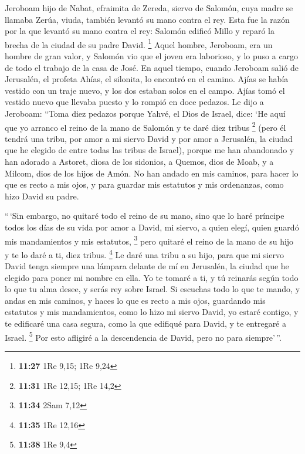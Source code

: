  Jeroboam hijo de Nabat, efraimita de Zereda, siervo de
Salomón, cuya madre se llamaba Zerúa, viuda, también levantó su mano
contra el rey.  Esta fue la razón por la que levantó su
mano contra el rey: Salomón edificó Millo y reparó la brecha de la
ciudad de su padre David. \footnote{\textbf{11:27} 1Re 9,15; 1Re 9,24}
 Aquel hombre, Jeroboam, era un hombre de gran valor, y
Salomón vio que el joven era laborioso, y lo puso a cargo de todo el
trabajo de la casa de José.  En aquel tiempo, cuando
Jeroboam salió de Jerusalén, el profeta Ahías, el silonita, lo encontró
en el camino. Ajías se había vestido con un traje nuevo, y los dos
estaban solos en el campo.  Ajías tomó el vestido nuevo
que llevaba puesto y lo rompió en doce pedazos.  Le dijo
a Jeroboam: ``Toma diez pedazos porque Yahvé, el Dios de Israel, dice:
`He aquí que yo arranco el reino de la mano de Salomón y te daré diez
tribus \footnote{\textbf{11:31} 1Re 12,15; 1Re 14,2} 
(pero él tendrá una tribu, por amor a mi siervo David y por amor a
Jerusalén, la ciudad que he elegido de entre todas las tribus de
Israel),  porque me han abandonado y han adorado a
Astoret, diosa de los sidonios, a Quemos, dios de Moab, y a Milcom, dios
de los hijos de Amón. No han andado en mis caminos, para hacer lo que es
recto a mis ojos, y para guardar mis estatutos y mis ordenanzas, como
hizo David su padre.

 ``\,`Sin embargo, no quitaré todo el reino de su mano,
sino que lo haré príncipe todos los días de su vida por amor a David, mi
siervo, a quien elegí, quien guardó mis mandamientos y mis estatutos,
\footnote{\textbf{11:34} 2Sam 7,12}  pero quitaré el
reino de la mano de su hijo y te lo daré a ti, diez tribus. \footnote{\textbf{11:35}
  1Re 12,16}  Le daré una tribu a su hijo, para que mi
siervo David tenga siempre una lámpara delante de mí en Jerusalén, la
ciudad que he elegido para poner mi nombre en ella.  Yo
te tomaré a ti, y tú reinarás según todo lo que tu alma desee, y serás
rey sobre Israel.  Si escuchas todo lo que te mando, y
andas en mis caminos, y haces lo que es recto a mis ojos, guardando mis
estatutos y mis mandamientos, como lo hizo mi siervo David, yo estaré
contigo, y te edificaré una casa segura, como la que edifiqué para
David, y te entregaré a Israel. \footnote{\textbf{11:38} 1Re 9,4}
 Por esto afligiré a la descendencia de David, pero no
para siempre'\,''.

